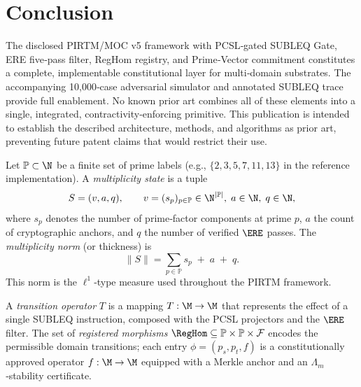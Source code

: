 \documentclass[11pt,a4paper]{article}
\theoremstyle{definition}
\theoremstyle{remark}
\newcommand{\norm}[1]{\|#1\|}
\begin{document}
\section{Conclusion}
\label{sec:conclusion}
The disclosed PIRTM/MOC v5 framework with PCSL‑gated SUBLEQ Gate, ERE five‑pass filter, RegHom registry, and Prime‑Vector commitment constitutes a complete, implementable constitutional layer for multi‑domain substrates. The accompanying 10,000‑case adversarial simulator and annotated SUBLEQ trace provide full enablement. No known prior art combines all of these elements into a single, integrated, contractivity‑enforcing primitive. This publication is intended to establish the described architecture, methods, and algorithms as prior art, preventing future patent claims that would restrict their use.

\label{sec:prelim}
Let $\mathbb{P} \subset \N$ be a finite set of prime labels (e.g., $\{2,3,5,7,11,13\}$ in the reference implementation). A \emph{multiplicity state} is a tuple
\[
S = (v, a, q), \qquad v = (s_p)_{p \in \mathbb{P}} \in \N^{|\mathbb{P}|},\; a \in \N,\; q \in \N,
\]
where $s_p$ denotes the number of prime‑factor components at prime $p$, $a$ the count of cryptographic anchors, and $q$ the number of verified $\ERE$ passes. The \emph{multiplicity norm} (or thickness) is
\begin{equation}\label{eq:norm}
\norm{S} = \sum_{p \in \mathbb{P}} s_p \;+\; a \;+\; q .
\end{equation}
This norm is the $\ell^1$‑type measure used throughout the PIRTM framework.

A \emph{transition operator} $T$ is a mapping $T: \M \to \M$ that represents the effect of a single SUBLEQ instruction, composed with the PCSL projectors and the $\ERE$ filter. The set of \emph{registered morphisms} $\RegHom \subseteq \mathbb{P} \times \mathbb{P} \times \mathcal{F}$ encodes the permissible domain transitions; each entry $\phi = (p_s, p_t, f)$ is a constitutionally approved operator $f: \M \to \M$ equipped with a Merkle anchor and an $\Lambda_m$‑stability certificate.
\end{document}
